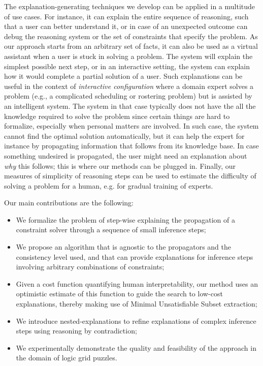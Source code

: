 The explanation-generating techniques we develop can be applied in a multitude of use cases. 
For instance, it can explain the entire sequence of reasoning, such that a user can better understand it, or in case of an unexpected outcome can debug the reasoning system or the set of constraints that specify the problem. 
As our approach starts from an arbitrary set of facts, it can also be used as a virtual assistant when a user is stuck in solving a problem.
The system will explain the simplest possible next step, or in an interactive setting, the system can explain how it would complete a partial solution of a user. Such explanations can be useful in the context of  \emph{interactive configuration} \cite{felfernig2014knowledge} where a domain expert solves a problem (e.g., a complicated scheduling or rostering problem) but is assisted by an intelligent system. 
The system in that case typically does not have the all the knowledge required to solve the problem since certain things are hard to formalize, especially when personal matters are involved. In such case, the system cannot find the optimal solution automatically, but it can help the expert for instance by propagating information that follows from its knowledge base. In case something undesired is propagated, the user might need an explanation about \emph{why} this follows; this is where our methods can be plugged in.
% 
% 
Finally, our measures of simplicity of reasoning steps can be used to estimate the difficulty of solving a problem for a human, e.g. for gradual training of experts.


Our main contributions are the following:
\begin{itemize}
	\item We formalize the problem of step-wise explaining the propagation of a constraint solver through a sequence of small inference steps;
	\item We propose an algorithm that is agnostic to the propagators and the consistency level used, and that can provide explanations for inference steps involving arbitrary combinations of constraints;
	\item Given a cost function quantifying human interpretability, our method uses an optimistic estimate of this function to guide the search to low-cost explanations, thereby making use of Minimal Unsatisfiable Subset extraction;
	\item We introduce nested-explanations to refine explanations of complex inference steps using reasoning by contradiction;
	\item We experimentally demonstrate the quality and feasibility of the approach in the domain of logic grid puzzles.
\end{itemize}


